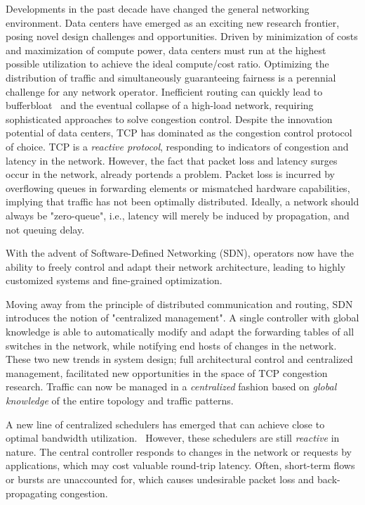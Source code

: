 Developments in the past decade have changed the general networking 
environment. Data centers have emerged as an exciting new research frontier, 
posing novel design challenges and opportunities. Driven by minimization of 
costs and maximization of compute power, data centers must run at the highest 
possible utilization to achieve the ideal compute/cost ratio.
Optimizing the distribution of traffic and simultaneously guaranteeing fairness 
is a perennial challenge for any network operator.
Inefficient routing can quickly lead to bufferbloat~\cite{bufferbloat} and the 
eventual collapse of a high-load network, requiring sophisticated 
approaches to solve congestion control.
Despite the innovation potential of data centers, TCP has dominated as 
the congestion control protocol of choice.
TCP is a \textit{reactive protocol}, responding to indicators of congestion and 
latency in the network. However, the fact that packet loss and latency 
surges occur in the network, already portends a problem. Packet loss is 
incurred by overflowing queues in forwarding elements or mismatched 
hardware capabilities, implying that traffic has not been optimally 
distributed. Ideally, a network should always be "zero-queue", i.e., latency 
will merely be induced by propagation, and not queuing delay.

With the advent of Software-Defined Networking (SDN), operators now have the 
ability to freely control and adapt their network architecture, leading to 
highly customized systems and fine-grained optimization.~\cite{sdn_road}

Moving away from the principle of distributed communication and routing, SDN 
introduces the notion of "centralized management". A single controller with 
global knowledge is able to automatically modify and adapt the forwarding 
tables of all switches in the network, while notifying end hosts of changes in 
the network.
These two new trends in system design; full architectural control and 
centralized management, facilitated new opportunities in the space of TCP 
congestion research. Traffic can now be managed in a  \textit{centralized} 
fashion based on \textit{global knowledge} of the entire topology and traffic 
patterns.

A new line of centralized schedulers has emerged that can achieve close to 
optimal bandwidth utilization.~\cite{hedera, fastpass, microte, b4, dionysus}
However, these schedulers are still  \textit{reactive}  in nature. The central 
controller responds to changes in the network or requests by applications, 
which may cost valuable round-trip latency. Often, short-term flows or bursts 
are unaccounted for, which causes undesirable packet loss and back-propagating 
congestion.



